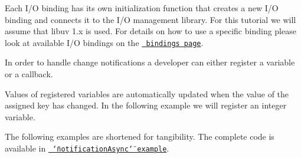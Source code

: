 Each I/O binding has its own initialization function that creates a new I/O binding and connects it to the I/O management library. For this tutorial we will assume that libuv 1.\+x is used. For details on how to use a specific binding please look at available I/O bindings on the \href{https://www.libelektra.org/bindings/readme}{\texttt{ bindings page}}.

In order to handle change notifications a developer can either register a variable or a callback.

Values of registered variables are automatically updated when the value of the assigned key has changed. In the following example we will register an integer variable.

The following examples are shortened for tangibility. The complete code is available in \href{https://www.libelektra.org/examples/notificationasync}{\texttt{ \char`\"{}notification\+Async\char`\"{} example}}.


